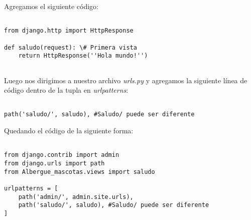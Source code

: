 \documentclass[12pt,letterpaper]{article}
\begin{document}
Agregamos el siguiente código:\\



\lstset{language=python, breaklines=true, basicstyle=\footnotesize}
\begin{lstlisting}[frame=single]

from django.http import HttpResponse

def saludo(request): \# Primera vista
    return HttpResponse(''Hola mundo!'')
    
\end{lstlisting}




Luego nos dirigimos a nuestro archivo \emph{urls.py} y agregamos la siguiente línea de código dentro de la tupla en \emph{urlpatterns}:




\lstset{language=python, breaklines=true, basicstyle=\footnotesize}
\begin{lstlisting}[frame=single]

path('saludo/', saludo), #Saludo/ puede ser diferente

\end{lstlisting}

Quedando el código de la siguiente forma:\\

\lstset{language=python, breaklines=true, basicstyle=\footnotesize}
\begin{lstlisting}[frame=single]

from django.contrib import admin
from django.urls import path
from Albergue_mascotas.views import saludo

urlpatterns = [
    path('admin/', admin.site.urls),
    path('saludo/', saludo), #Saludo/ puede ser diferente
]

\end{lstlisting}
\end{document}
